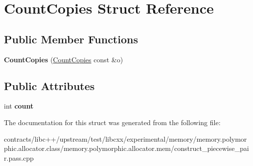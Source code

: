 \hypertarget{struct_count_copies}{}\section{Count\+Copies Struct Reference}
\label{struct_count_copies}
\subsection*{Public Member Functions}
\begin{DoxyCompactItemize}
\item 
\mbox{\label{struct_count_copies_ab240a6af776f18d2b04ba69ff5453e42}} 
{\bfseries Count\+Copies} (\mbox{\hyperlink{struct_count_copies}{Count\+Copies}} const \&o)
\end{DoxyCompactItemize}
\subsection*{Public Attributes}
\begin{DoxyCompactItemize}
\item 
\mbox{\label{struct_count_copies_a38b31ec157bdc6c311233a56e32eec02}} 
int {\bfseries count}
\end{DoxyCompactItemize}


The documentation for this struct was generated from the following file\+:\begin{DoxyCompactItemize}
\item 
contracts/libc++/upstream/test/libcxx/experimental/memory/memory.\+polymorphic.\+allocator.\+class/memory.\+polymorphic.\+allocator.\+mem/construct\+\_\+piecewise\+\_\+pair.\+pass.\+cpp\end{DoxyCompactItemize}
